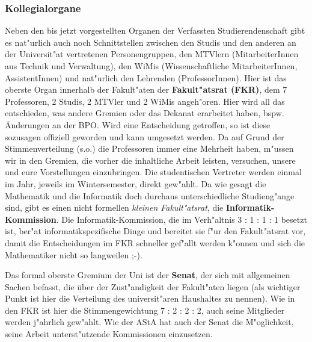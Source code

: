 \begin{multicols}{2}
	\subsubsection*{Kollegialorgane}
		Neben den bis jetzt vorgestellten Organen der Verfassten Studierendenschaft gibt es nat"urlich auch noch Schnittstellen zwischen den Studis und den anderen an der Universit"at vertretenen Personengruppen, den MTVlern (MitarbeiterInnen aus Technik und Verwaltung), den WiMis (Wissenschaftliche MitarbeiterInnen, AssistentInnen) und nat"urlich den Lehrenden (ProfessorInnen). Hier ist das oberste Organ innerhalb der Fakult"aten der \textbf{Fakult"atsrat (FKR)}, dem 7 Professoren, 2 Studis, 2 MTVler und 2 WiMis angeh"oren. Hier wird all das entschieden, was andere Gremien oder das Dekanat erarbeitet haben, bspw. Änderungen an der BPO. Wird eine Entscheidung getroffen, so ist diese sozusagen offiziell geworden und kann umgesetzt werden. Da auf Grund der Stimmenverteilung (s.o.) die Professoren immer eine Mehrheit haben, m"ussen wir in den Gremien, die vorher die inhaltliche Arbeit leisten, versuchen, unsere und eure Vorstellungen einzubringen. Die studentischen Vertreter werden einmal im Jahr, jeweils im Wintersemester, direkt gew"ahlt. Da wie gesagt die Mathematik und die Informatik doch durchaus unterschiedliche Studieng"ange sind, gibt es einen nicht formellen \emph{kleinen Fakult"atsrat}, die \textbf{Informatik-Kommission}. Die Informatik-Kommission, die im Verh"altnis 3 : 1 : 1 : 1 besetzt ist, ber"at informatikspezifische Dinge und bereitet sie f"ur den Fakult"atsrat vor, damit die Entscheidungen im FKR schneller gef"allt werden k"onnen und sich die Mathematiker nicht so langweilen ;-).

		Das formal oberste Gremium der Uni ist der \textbf{Senat}, der sich mit allgemeinen Sachen befasst, die über der Zust"andigkeit der Fakult"aten liegen (als wichtiger Punkt ist hier die Verteilung des universit"aren Haushaltes zu nennen). Wie in den FKR ist hier die Stimmengewichtung 7 : 2 : 2 : 2, auch seine Mitglieder werden j"ahrlich gew"ahlt. Wie der AStA hat auch der Senat die M"oglichkeit, seine Arbeit unterst"utzende Kommissionen einzusetzen.


\end{multicols}
